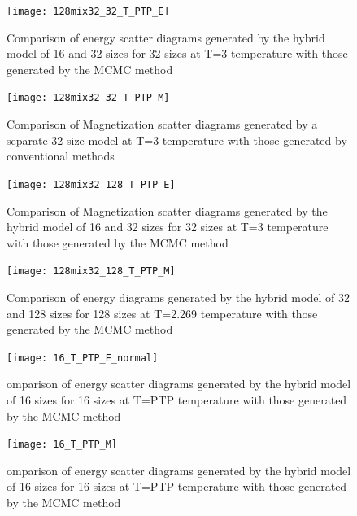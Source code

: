 \documentclass[%
reprint,
amsmath,amssymb,
aps,
]{revtex4-2}
\begin{document}
	\begin{figure}
		\centering
		\texttt{[image: 128mix32\_32\_T\_PTP\_E]}
		\caption{Comparison of energy scatter diagrams generated by the hybrid model of 16 and 32 sizes for 32 sizes at T=3 temperature with those generated by the MCMC method}
		\label{fig:16mix3232t3esactter}
	\end{figure}
	\begin{figure}
		\centering
		\texttt{[image: 128mix32\_32\_T\_PTP\_M]}
		\caption{Comparison of Magnetization scatter diagrams generated by a separate 32-size model at T=3 temperature with those generated by conventional methods}
		\label{fig:32t3mscatter}
	\end{figure}
	\begin{figure}
		\centering
		\texttt{[image: 128mix32\_128\_T\_PTP\_E]}
		\caption{Comparison of Magnetization scatter diagrams generated by the hybrid model of 16 and 32 sizes for 32 sizes at T=3 temperature with those generated by the MCMC method}
		\label{fig:16mix3232t3mscatter}
	\end{figure}
	\begin{figure}
		\centering
		\texttt{[image: 128mix32\_128\_T\_PTP\_M]}
		\caption{Comparison of energy diagrams generated by the hybrid model of 32 and 128 sizes for 128 sizes at T=2.269 temperature with those generated by the MCMC method}
		\label{fig:128mix32128tptpe}
	\end{figure}
	\begin{figure}
		\centering
		\texttt{[image: 16\_T\_PTP\_E\_normal]}
		\caption{omparison of energy scatter diagrams generated by the hybrid model of 16 sizes for 16 sizes at T=PTP temperature with those generated by the MCMC method}
		\label{fig:16tptpe}
	\end{figure}
	\begin{figure}
		\centering
		\texttt{[image: 16\_T\_PTP\_M]}
		\caption{omparison of energy scatter diagrams generated by the hybrid model of 16 sizes for 16 sizes at T=PTP temperature with those generated by the MCMC method}
		\label{fig:16tptpm}
	\end{figure}
		
		
	
\end{document}
